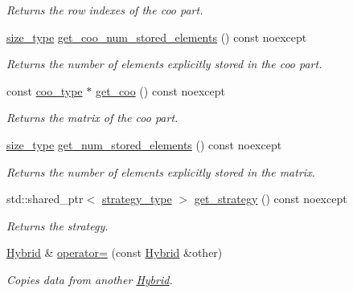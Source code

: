 \begin{DoxyCompactItemize}
\begin{DoxyCompactList}\small\item\em Returns the row indexes of the coo part. \end{DoxyCompactList}\item 
\hyperlink{namespacegko_a6e5c95df0ae4e47aab2f604a22d98ee7}{size\+\_\+type} \hyperlink{classgko_1_1matrix_1_1Hybrid_a2fe06adb3323dcad710329e33a12dff4}{get\+\_\+coo\+\_\+num\+\_\+stored\+\_\+elements} () const noexcept
\begin{DoxyCompactList}\small\item\em Returns the number of elements explicitly stored in the coo part. \end{DoxyCompactList}\item 
const \hyperlink{classgko_1_1matrix_1_1Coo}{coo\+\_\+type} $\ast$ \hyperlink{classgko_1_1matrix_1_1Hybrid_a80eb99775093553db1029b9675f34e2c}{get\+\_\+coo} () const noexcept
\begin{DoxyCompactList}\small\item\em Returns the matrix of the coo part. \end{DoxyCompactList}\item 
\hyperlink{namespacegko_a6e5c95df0ae4e47aab2f604a22d98ee7}{size\+\_\+type} \hyperlink{classgko_1_1matrix_1_1Hybrid_a00e86ba08ecfc46dbc9b74b800d10a8d}{get\+\_\+num\+\_\+stored\+\_\+elements} () const noexcept
\begin{DoxyCompactList}\small\item\em Returns the number of elements explicitly stored in the matrix. \end{DoxyCompactList}\item 
std\+::shared\+\_\+ptr$<$ \hyperlink{classgko_1_1matrix_1_1Hybrid_1_1strategy__type}{strategy\+\_\+type} $>$ \hyperlink{classgko_1_1matrix_1_1Hybrid_a8be764050176291d35e7b4dee1b6e1bc}{get\+\_\+strategy} () const noexcept
\begin{DoxyCompactList}\small\item\em Returns the strategy. \end{DoxyCompactList}\item 
\hyperlink{classgko_1_1matrix_1_1Hybrid}{Hybrid} \& \hyperlink{classgko_1_1matrix_1_1Hybrid_a401af55be629372e3114b67df6fc4d04}{operator=} (const \hyperlink{classgko_1_1matrix_1_1Hybrid}{Hybrid} \&other)
\begin{DoxyCompactList}\small\item\em Copies data from another \hyperlink{classgko_1_1matrix_1_1Hybrid}{Hybrid}. \end{DoxyCompactList}\end{DoxyCompactItemize}
